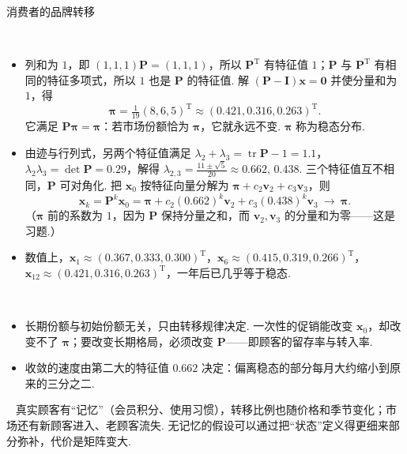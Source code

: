 \documentclass[lang=cn,10.5pt,scheme=chinese,toc=twocol,section,chinesefont=nofont,
twoside,citestyle=gb7714-2015,bibstyle=gb7714-2015]{elegantbook}
\DeclareRobustCommand{\textbf}[1]{{\lnsemiboldlatin\lnsemiboldcjk #1}}
\newcommand{\vv}[1]{\boldsymbol{#1}}
\newcommand{\zero}{\boldsymbol{0}}          %
\newcommand{\trans}{\mathrm{T}}             %
\numberwithin{equation}{section}   %
\newcommand{\mstep}[1]{\par\smallskip\noindent\textbf{【#1】}\ }
\begin{document}
\begin{modelbox}{消费者的品牌转移}
\begin{center}
  \end{center}
  \mstep{求解}
  \begin{itemize}
    \item 列和为 $1$，即 $(1,1,1)\vv P=(1,1,1)$，所以 $\vv P^\trans$ 有特征值 $1$；$\vv P$ 与 $\vv P^\trans$ 有相同的特征多项式，所以 $1$ 也是 $\vv P$ 的特征值. 解 $(\vv P-\vv I)\vv x=\zero$ 并使分量和为 $1$，得
          \[\vv\pi=\tfrac1{19}(8,6,5)^\trans\approx(0.421,0.316,0.263)^\trans.\]
          它满足 $\vv P\vv\pi=\vv\pi$：若市场份额恰为 $\vv\pi$，它就永远不变. $\vv\pi$ 称为\textbf{稳态分布}.
    \item 由迹与行列式，另两个特征值满足 $\lambda_2+\lambda_3=\operatorname{tr}\vv P-1=1.1$，$\lambda_2\lambda_3=\det\vv P=0.29$，解得 $\lambda_{2,3}=\frac{11\pm\sqrt5}{20}\approx0.662,\,0.438$. 三个特征值互不相同，$\vv P$ 可对角化. 把 $\vv x_0$ 按特征向量分解为 $\vv\pi+c_2\vv v_2+c_3\vv v_3$，则
          \[\vv x_k=\vv P^k\vv x_0=\vv\pi+c_2(0.662)^k\vv v_2+c_3(0.438)^k\vv v_3\ \longrightarrow\ \vv\pi.\]
          （$\vv\pi$ 前的系数为 $1$，因为 $\vv P$ 保持分量之和，而 $\vv v_2,\vv v_3$ 的分量和为零——这是习题.）
    \item 数值上，$\vv x_1\approx(0.367,0.333,0.300)^\trans$，$\vv x_6\approx(0.415,0.319,0.266)^\trans$，$\vv x_{12}\approx(0.421,0.316,0.263)^\trans$，一年后已几乎等于稳态.
  \end{itemize}

  \mstep{解读}
  \begin{itemize}
    \item 长期份额与\textbf{初始份额无关}，只由转移规律决定. 一次性的促销能改变 $\vv x_0$，却改变不了 $\vv\pi$；要改变长期格局，必须改变 $\vv P$——即顾客的留存率与转入率.
    \item 收敛的速度由第二大的特征值 $0.662$ 决定：偏离稳态的部分每月大约缩小到原来的三分之二.
  \end{itemize}

  \mstep{局限} 真实顾客有“记忆”（会员积分、使用习惯），转移比例也随价格和季节变化；市场还有新顾客进入、老顾客流失. 无记忆的假设可以通过把“状态”定义得更细来部分弥补，代价是矩阵变大.

\end{modelbox}
\end{document}
